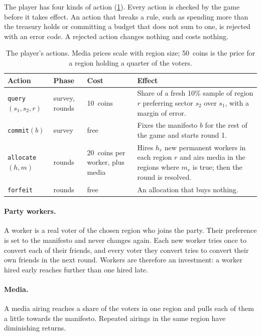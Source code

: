 \documentclass[11pt,a4paper,oneside]{report}
\newcommand{\coins}[1]{#1~coins}
\newcommand{\code}[1]{\texttt{#1}}
\begin{document}
The player has four kinds of action (\cref{tab:actions}). Every action is checked by the game before it
takes effect. An action that breaks a rule, such as spending more than the treasury holds or committing a
budget that does not sum to one, is rejected with an error code. A rejected action changes nothing and
costs nothing.

\begin{table}[t]
\centering
\caption{The player's actions. Media prices scale with region size; \coins{50} is the price for a region
holding a quarter of the voters.}
\label{tab:actions}
\small
\begin{tabularx}{\linewidth}{@{}l l l X@{}}
\toprule
Action & Phase & Cost & Effect \\
\midrule
\code{query}$(s_1,s_2,r)$ & survey, rounds & \coins{10} &
  Share of a fresh 10\% sample of region $r$ preferring sector $s_2$ over $s_1$, with a margin of error. \\
\code{commit}$(b)$ & survey & free &
  Fixes the manifesto $b$ for the rest of the game and starts round 1. \\
\code{allocate}$(h, m)$ & rounds & \coins{20} per worker, plus media &
  Hires $h_r$ new permanent workers in each region $r$ and airs media in the regions where $m_r$ is true;
  then the round is resolved. \\
\code{forfeit} & rounds & free & An allocation that buys nothing. \\
\bottomrule
\end{tabularx}
\end{table}

\paragraph{Party workers.} A worker is a real voter of the chosen region who joins the party. Their
preference is set to the manifesto and never changes again. Each new worker tries once to convert each of
their friends, and every voter they convert tries to convert their own friends in the next round. Workers
are therefore an investment: a worker hired early reaches further than one hired late.

\paragraph{Media.} A media airing reaches a share of the voters in one region and pulls each of them a
little towards the manifesto. Repeated airings in the same region have diminishing returns.
\end{document}

